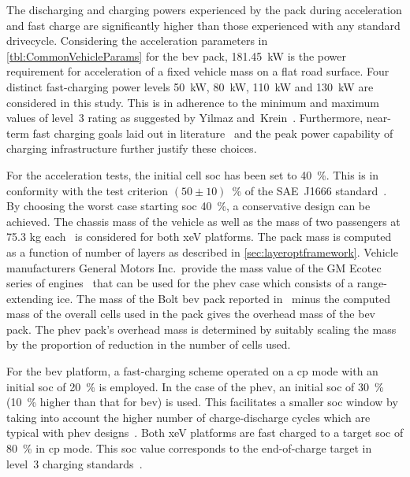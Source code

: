 The   discharging  and   charging  powers   experienced  by   the  pack   during
acceleration and  fast charge  are significantly  higher than  those experienced
with  any  standard  drivecycle.  Considering  the  acceleration  parameters  in
\cref{tbl:CommonVehicleParams} for  the \gls{bev}  pack, \SI{181.45}{\kilo\watt}
is   the  power   requirement  for   acceleration  of   a  fixed   vehicle  mass
on   a   flat  road   surface.   Four   distinct  fast-charging   power   levels
\viz{}   \SI{50}{\kilo\watt},   \SI{80}{\kilo\watt},  \SI{110}{\kilo\watt}   and
\SI{130}{\kilo\watt}  are considered  in this  study.  This is  in adherence  to
the  minimum  and maximum  values  of  level~3  rating  as suggested  by  Yilmaz
and~Krein~\cite{Yilmaz2012}. Furthermore, near-term fast charging goals laid out
in  literature~\cite{Ashique2017,Srdic2016} and  the  peak  power capability  of
charging infrastructure further justify these choices.



For  the  acceleration  tests,  the  initial cell  \gls{soc}  has  been  set  to
\SI{40}{\percent}.  This  is  in  conformity with  the  test  criterion  $(50\pm
10)$~\%  of  the  SAE~J1666   standard~\cite{Sae2010}.  By  choosing  the  worst
case  starting  \gls{soc} \ie{}  \SI{40}{\percent},  a  conservative design  can
be  achieved.  The  chassis  mass  of  the  vehicle  as  well  as  the  mass  of
two  passengers   at  75.3  kg   each~\cite{Sae2010}  is  considered   for  both
\gls{xeV}  platforms. The  pack mass  is  computed as  a function  of number  of
layers  as  described  in  \cref{sec:layeroptframework}.  Vehicle  manufacturers
General  Motors  Inc.\, provide  the  mass  value of  the  GM  Ecotec series  of
engines~\cite{motortrendEcotec} that can  be used for the  \gls{phev} case which
consists of  a range-extending \gls{ice}.  The mass  of the Bolt  \gls{bev} pack
reported in~\cite{ChevyBoltSpecs} minus  the computed mass of  the overall cells
used in the pack  gives the overhead mass of the  \gls{bev} pack. The \gls{phev}
pack's  overhead  mass  is  determined  by suitably  scaling  the  mass  by  the
proportion of reduction in the number of cells used.


For the \gls{bev}  platform, a fast-charging scheme operated on  a \gls{cp} mode
with an initial  \gls{soc} of \SI{20}{\percent} is employed. In  the case of the
\gls{phev}, an initial \gls{soc}  of \SI{30}{\percent} (\SI{10}{\percent} higher
than that for \gls{bev}) is used. This facilitates a smaller \gls{soc} window by
taking  into account  the higher  number  of charge-discharge  cycles which  are
typical with \gls{phev}  designs~\cite{Maksimovic2012}. Both \gls{xeV} platforms
are fast  charged to a target  \gls{soc} of \SI{80}{\percent} in  \gls{cp} mode.
This \gls{soc} value corresponds to the end-of-charge target in level~3 charging
standards~\cite{SAECharging2011}.

